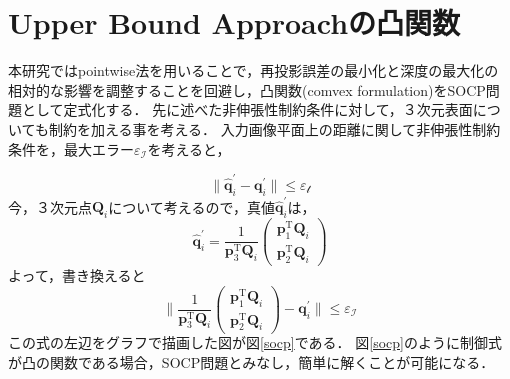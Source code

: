 \documentclass[10.5pt,twocolumn,a4j,fleqn]{ujarticle}
\def\figref#1{図\ref{#1}}
\begin{document}
\section{Upper Bound Approachの凸関数} \label{sec:socp}
本研究ではpointwise法を用いることで，再投影誤差の最小化と深度の最大化の相対的な影響を調整することを回避し，凸関数(comvex formulation)をSOCP問題として定式化する．
先に述べた非伸張性制約条件に対して，３次元表面についても制約を加える事を考える．
入力画像平面上の距離に関して非伸張性制約条件を，最大エラー$\varepsilon_{\mathcal{I}}$を考えると，

\begin{equation}
    \| \hat{\bm{q}}_i^{\prime} - \bm{q}_i^{\prime}\| \le \varepsilon_{\mathcal{t}}
\end{equation}
今，３次元点$\bm{Q}_i$について考えるので，真値$\hat{\bm{q}}_i^{\prime}$は，
\begin{equation}
    \hat{\bm{q}}_i^{\prime} = \frac{1}{\mathrm{\bm{p}}_3^{\mathrm{T}} \bm{Q}_i} \left(
    \begin{array}{c}
      \mathrm{\bm{p}}_1^{\mathrm{T}} \bm{Q}_i  \\
      \mathrm{\bm{p}}_2^{\mathrm{T}} \bm{Q}_i
    \end{array}
  \right)
\end{equation}
よって，書き換えると
\begin{equation}
    \| 
    \frac{1}{\mathrm{\bm{p}}_3^{\mathrm{T}} \bm{Q}_i} \left(
    \begin{array}{c}
      \mathrm{\bm{p}}_1^{\mathrm{T}} \bm{Q}_i  \\
      \mathrm{\bm{p}}_2^{\mathrm{T}} \bm{Q}_i
    \end{array}
  \right)
 - \bm{q}_i^{\prime}\| \le \varepsilon_{\mathcal{I}}
 \label{eq:cons_tmp_img}
\end{equation}
この式の左辺をグラフで描画した図が\figref{socp}である．
\figref{socp}のように制御式が凸の関数である場合，SOCP問題とみなし，簡単に解くことが可能になる．
\end{document}
